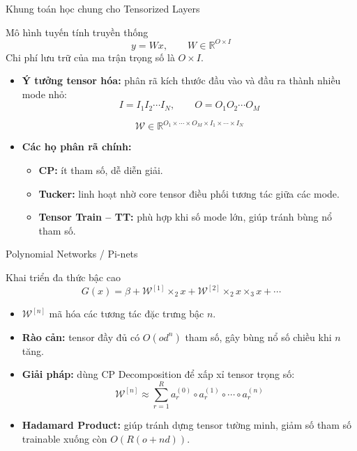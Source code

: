 \begin{frame}{Khung toán học chung cho Tensorized Layers}
    \begin{block}{Mô hình tuyến tính truyền thống}
        \[
            y = Wx,
            \qquad
            W \in \mathbb{R}^{O \times I}
        \]
        Chi phí lưu trữ của ma trận trọng số là $O \times I$.
    \end{block}

    \begin{itemize}
        \item \textbf{Ý tưởng tensor hóa:} phân rã kích thước đầu vào và đầu ra thành nhiều mode nhỏ:
        \[
            I = I_1 I_2 \cdots I_N,
            \qquad
            O = O_1 O_2 \cdots O_M
        \]

        \[
            \mathcal{W}
            \in
            \mathbb{R}^{O_1 \times \cdots \times O_M
            \times I_1 \times \cdots \times I_N}
        \]

        \item \textbf{Các họ phân rã chính:}
        \begin{itemize}
            \item \textbf{CP:} ít tham số, dễ diễn giải.
            \item \textbf{Tucker:} linh hoạt nhờ core tensor điều phối tương tác giữa các mode.
            \item \textbf{Tensor Train -- TT:} phù hợp khi số mode lớn, giúp tránh bùng nổ tham số.
        \end{itemize}
    \end{itemize}
\end{frame}


\begin{frame}{Polynomial Networks / Pi-nets}
    \begin{block}{Khai triển đa thức bậc cao}
        \[
            G(x)
            =
            \beta
            +
            \mathcal{W}^{[1]}\times_2 x
            +
            \mathcal{W}^{[2]}\times_2 x \times_3 x
            +
            \cdots
        \]
    \end{block}

    \begin{itemize}
        \item $\mathcal{W}^{[n]}$ mã hóa các tương tác đặc trưng bậc $n$.
        \item \textbf{Rào cản:} tensor đầy đủ có $O(od^n)$ tham số, gây bùng nổ số chiều khi $n$ tăng.
        \item \textbf{Giải pháp:} dùng CP Decomposition để xấp xỉ tensor trọng số:
        \[
            \mathcal{W}^{[n]}
            \approx
            \sum_{r=1}^{R}
            a^{(0)}_r
            \circ
            a^{(1)}_r
            \circ
            \cdots
            \circ
            a^{(n)}_r
        \]

        \item \textbf{Hadamard Product:} giúp tránh dựng tensor tường minh, giảm số tham số trainable xuống còn $O(R(o+nd))$.
    \end{itemize}
\end{frame}


